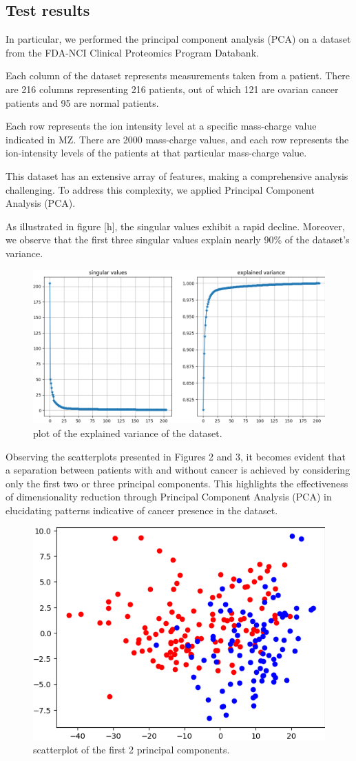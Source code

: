 \documentclass{article}
\begin{document}
\subsection{Test results}
In particular, we performed the principal component analysis (PCA) on a dataset from the FDA-NCI Clinical Proteomics Program Databank.

Each column of the dataset represents measurements taken from a patient. There are 216 columns representing 216 patients, out of which 121 are ovarian cancer patients and 95 are normal patients.

Each row represents the ion intensity level at a specific mass-charge value indicated in MZ. There are 2000 mass-charge values, and each row represents the ion-intensity levels of the patients at that particular mass-charge value.

\vspace{\baselineskip}
This dataset has an extensive array of features, making a comprehensive analysis challenging. To address this complexity, we applied Principal Component Analysis (PCA).

As illustrated in {figure} [h], the singular values exhibit a rapid decline. Moreover, we observe that the first three singular values explain nearly 90\% of the dataset's variance.

\begin{figure}[h]
\centering
\includegraphics[width=0.55\linewidth]{pca_explained_variance200.png}
\caption{\label{pca1}plot of the explained variance of the dataset.}
\end{figure}

Observing the scatterplots presented in Figures 2 and 3, it becomes evident that a separation between patients with and without cancer is achieved by considering only the first two or three principal components. This highlights the effectiveness of dimensionality reduction through Principal Component Analysis (PCA) in elucidating patterns indicative of cancer presence in the dataset.

\begin{figure}
\centering
\includegraphics[width=0.35\linewidth]{pca_2scatterplot.png}
\caption{\label{pca2}scatterplot of the first 2 principal components.}
\end{figure}
\end{document}

